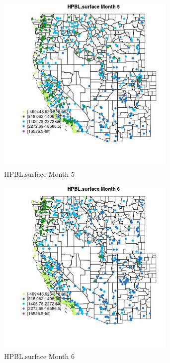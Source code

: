 \begin{figure} 
\centering  
\includegraphics[width=0.77\textwidth]{Code_Outputs/Report_ML_input_PM25_Step4_part_e_de_duplicated_aves_compiled_2019-05-14wNAs_MapObsMo5HPBLsurface.jpg} 
\caption{\label{fig:Report_ML_input_PM25_Step4_part_e_de_duplicated_aves_compiled_2019-05-14wNAsMapObsMo5HPBLsurface}HPBL.surface Month 5} 
\end{figure} 
 

\begin{figure} 
\centering  
\includegraphics[width=0.77\textwidth]{Code_Outputs/Report_ML_input_PM25_Step4_part_e_de_duplicated_aves_compiled_2019-05-14wNAs_MapObsMo6HPBLsurface.jpg} 
\caption{\label{fig:Report_ML_input_PM25_Step4_part_e_de_duplicated_aves_compiled_2019-05-14wNAsMapObsMo6HPBLsurface}HPBL.surface Month 6} 
\end{figure} 
 

